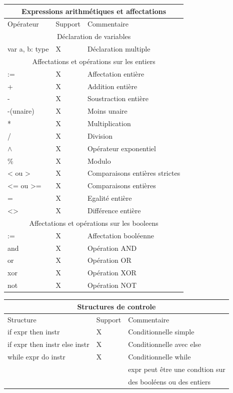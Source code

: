 \documentclass[a4paper]{article}
\begin{document}
\begin{center}
\begin{tabular}{|l|l|l|}
  \hline
  \multicolumn{3}{|c|}{Expressions arithmétiques et affectations} \\
  \hline
  Opérateur & Support & Commentaire \\
  \hline
  \multicolumn{3}{|c|}{Déclaration de variables} \\
  \hline
  var a, b: type & X & Déclaration multiple \\
  \hline
  \multicolumn{3}{|c|}{Affectations et opérations sur les entiers} \\
  \hline
  := & X & Affectation entière\\
  + & X & Addition entière \\
  - & X & Soustraction entière \\
  -(unaire) & X & Moins unaire \\
  * & X & Multiplication \\
  / & X & Division \\
  $\wedge$ & X & Opérateur exponentiel \\
  \% & X & Modulo \\
  < ou > & X & Comparaisons entières strictes \\
  <= ou >= & X & Comparaisons entières \\
  = & X & Egalité entière \\
  <> & X & Différence entière \\
  \hline
  \multicolumn{3}{|c|}{Affectations et opérations sur les booleens} \\
  \hline
  := & X & Affectation booléenne \\
  and & X & Opération AND \\
  or & X & Opération OR \\
  xor & X & Opération XOR \\
  not & X & Opération NOT \\
  \hline
\end{tabular}

\begin{tabular}{|l|l|l|}
  \hline
  \multicolumn{3}{|c|}{Structures de controle} \\
  \hline
  Structure & Support & Commentaire \\
  \hline
  if expr then instr & X & Conditionnelle simple \\
  if expr then instr else instr & X & Conditionnelle avec else \\
  while expr do instr & X & Conditionnelle while \\
  & & expr peut être une condtion sur \\
  & & des booléens ou des entiers \\
  \hline
\end{tabular}



\end{center}
\end{document}

